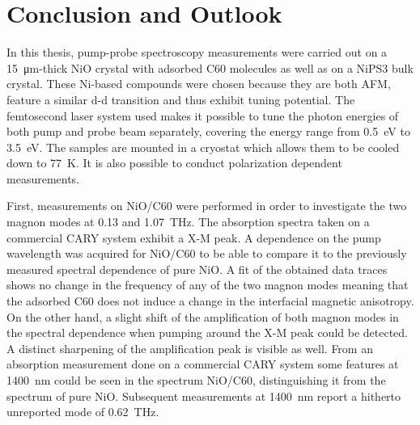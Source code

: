 \chapter{Conclusion and Outlook}

In this thesis, pump-probe spectroscopy measurements were carried out on a \qty{15}{\um}-thick NiO crystal with adsorbed C60 molecules as well as on a NiPS3 bulk crystal.
These Ni-based compounds were chosen because they are both AFM, feature a similar d-d transition and thus exhibit tuning potential.
The femtosecond laser system used makes it possible to tune the photon energies of both pump and probe beam separately, covering the energy range from \qty{0.5}{eV} to \qty{3.5}{eV}.
The samples are mounted in a cryostat which allows them to be cooled down to \qty{77}{K}.
It is also possible to conduct polarization dependent measurements.

First, measurements on NiO/C60 were performed in order to investigate the two magnon modes at 0.13 and \qty{1.07}{THz}.
The absorption spectra taken on a commercial CARY system exhibit a X-M peak.
A dependence on the pump wavelength was acquired for NiO/C60 to be able to compare it to the previously measured spectral dependence of pure NiO.
A fit of the obtained data traces shows no change in the frequency of any of the two magnon modes meaning that the adsorbed C60 does not induce a change in the interfacial magnetic anisotropy.
On the other hand, a slight shift of the amplification of both magnon modes in the spectral dependence when pumping around the X-M peak could be detected.
A distinct sharpening of the amplification peak is visible as well.
From an absorption measurement done on a commercial CARY system some features at \qty{1400}{nm} could be seen in the spectrum NiO/C60, distinguishing it from the spectrum of pure NiO.
Subsequent measurements at \qty{1400}{nm} report a hitherto unreported mode of \qty{0.62}{THz}.

